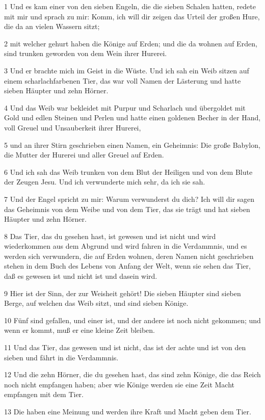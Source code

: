 \par 1 Und es kam einer von den sieben Engeln, die die sieben Schalen hatten, redete mit mir und sprach zu mir: Komm, ich will dir zeigen das Urteil der großen Hure, die da an vielen Wassern sitzt;
\par 2 mit welcher gehurt haben die Könige auf Erden; und die da wohnen auf Erden, sind trunken geworden von dem Wein ihrer Hurerei.
\par 3 Und er brachte mich im Geist in die Wüste. Und ich sah ein Weib sitzen auf einem scharlachfarbenen Tier, das war voll Namen der Lästerung und hatte sieben Häupter und zehn Hörner.
\par 4 Und das Weib war bekleidet mit Purpur und Scharlach und übergoldet mit Gold und edlen Steinen und Perlen und hatte einen goldenen Becher in der Hand, voll Greuel und Unsauberkeit ihrer Hurerei,
\par 5 und an ihrer Stirn geschrieben einen Namen, ein Geheimnis: Die große Babylon, die Mutter der Hurerei und aller Greuel auf Erden.
\par 6 Und ich sah das Weib trunken von dem Blut der Heiligen und von dem Blute der Zeugen Jesu. Und ich verwunderte mich sehr, da ich sie sah.
\par 7 Und der Engel spricht zu mir: Warum verwunderst du dich? Ich will dir sagen das Geheimnis von dem Weibe und von dem Tier, das sie trägt und hat sieben Häupter und zehn Hörner.
\par 8 Das Tier, das du gesehen hast, ist gewesen und ist nicht und wird wiederkommen aus dem Abgrund und wird fahren in die Verdammnis, und es werden sich verwundern, die auf Erden wohnen, deren Namen nicht geschrieben stehen in dem Buch des Lebens von Anfang der Welt, wenn sie sehen das Tier, daß es gewesen ist und nicht ist und dasein wird.
\par 9 Hier ist der Sinn, der zur Weisheit gehört! Die sieben Häupter sind sieben Berge, auf welchen das Weib sitzt, und sind sieben Könige.
\par 10 Fünf sind gefallen, und einer ist, und der andere ist noch nicht gekommen; und wenn er kommt, muß er eine kleine Zeit bleiben.
\par 11 Und das Tier, das gewesen und ist nicht, das ist der achte und ist von den sieben und fährt in die Verdammnis.
\par 12 Und die zehn Hörner, die du gesehen hast, das sind zehn Könige, die das Reich noch nicht empfangen haben; aber wie Könige werden sie eine Zeit Macht empfangen mit dem Tier.
\par 13 Die haben eine Meinung und werden ihre Kraft und Macht geben dem Tier.
